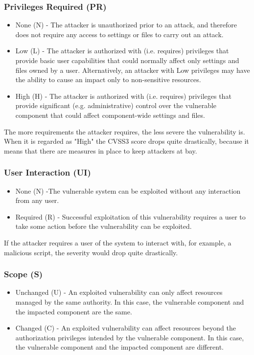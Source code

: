 \subsubsection{Privileges Required (PR)}

\begin{itemize}
	\item None (N) - The attacker is unauthorized prior to an attack, and therefore does not require any access to settings or files to carry out an attack.
	\item Low (L) - The attacker is authorized with (i.e. requires) privileges that provide basic user capabilities that could normally affect only settings and files owned by a user. Alternatively, an attacker with Low privileges may have the ability to cause an impact only to non-sensitive resources.
	\item High (H) - The attacker is authorized with (i.e. requires) privileges that provide significant (e.g. administrative) control over the vulnerable component that could affect component-wide settings and files.
\end{itemize}

The more requirements the attacker requires, the less severe the vulnerability is. When it is regarded as "High" the CVSS3 score drops quite drastically, because it means that there are measures in place to keep attackers at bay.

\subsubsection{User Interaction (UI)}

\begin{itemize}
	\item None (N) -The vulnerable system can be exploited without any interaction from any user.
	\item Required (R) - Successful exploitation of this vulnerability requires a user to take some action before the vulnerability can be exploited. 
\end{itemize}

If the attacker requires a user of the system to interact with, for example, a malicious script, the severity would drop quite drastically.

\subsubsection{Scope (S)}

\begin{itemize}
	\item Unchanged (U) - An exploited vulnerability can only affect resources managed by the same authority. In this case, the vulnerable component and the impacted component are the same.
	\item Changed (C) - An exploited vulnerability can affect resources beyond the authorization privileges intended by the vulnerable component. In this case, the vulnerable component and the impacted component are different. 
\end{itemize}


